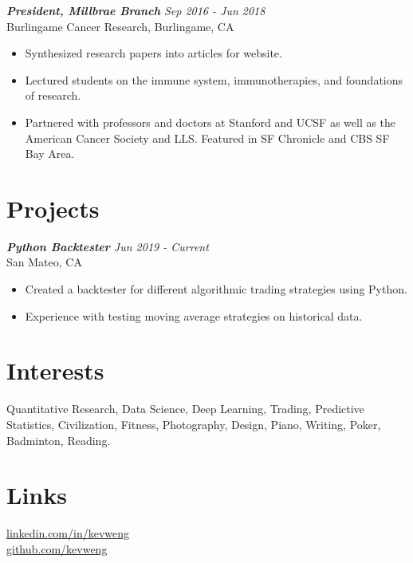 \documentclass[margin, 10pt]{res} %
\begin{document}
\begin{resume}
{\sl {\bf President, Millbrae Branch} \hfill Sep 2016 - Jun 2018} \\
Burlingame Cancer Research, Burlingame, CA
\begin{itemize}  \itemsep -1pt
\item Synthesized research papers into articles for website. 
\item Lectured students on the immune system, immunotherapies, and foundations of research.
\item Partnered with professors and doctors at Stanford and UCSF as well as the American Cancer Society and LLS. Featured in SF Chronicle and CBS SF Bay Area.
\end{itemize} 




\section{\large Projects} 

{\sl {\bf Python Backtester} \hfill Jun 2019 - Current} \\
San Mateo, CA
\begin{itemize}  \itemsep -1pt
\item Created a backtester for different algorithmic trading strategies using Python.
\item Experience with testing moving average strategies on historical data.
\end{itemize} 
\section{\large Interests}
Quantitative Research, Data Science, Deep Learning, Trading, Predictive Statistics, Civilization, Fitness, Photography, Design, Piano, Writing, Poker, Badminton, Reading.

\section{\large Links}

\href{https://www.linkedin.com/in/kevinweng2000/}{linkedin.com/in/kevweng}\\
\href{https://github.com/kevweng}{github.com/kevweng}

\end{resume}
\end{document}
